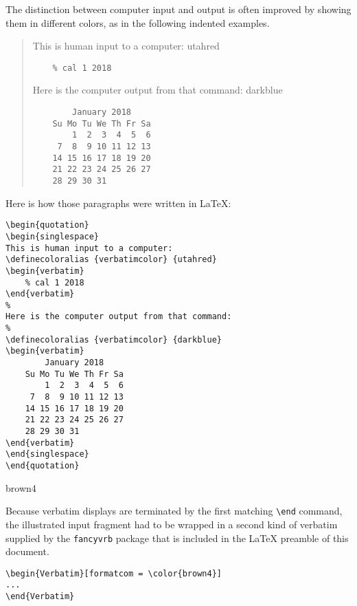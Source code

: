The distinction between computer input and output is often improved by
showing them in different colors, as in the following indented examples.

\begin{quotation}
\begin{singlespace}
This is human input to a computer:
 {utahred}
\begin{verbatim}
    % cal 1 2018
\end{verbatim}
%
Here is the computer output from that command:
%
 {darkblue}
\begin{verbatim}
        January 2018      
    Su Mo Tu We Th Fr Sa  
        1  2  3  4  5  6  
     7  8  9 10 11 12 13  
    14 15 16 17 18 19 20  
    21 22 23 24 25 26 27  
    28 29 30 31           
\end{verbatim}
\end{singlespace}
\end{quotation}
%
Here is how those paragraphs were written in \LaTeX{}:
%
\begin{Verbatim}[formatcom = \color{brown4}]
\begin{quotation}
\begin{singlespace}
This is human input to a computer:
\definecoloralias {verbatimcolor} {utahred}
\begin{verbatim}
    % cal 1 2018
\end{verbatim}
%
Here is the computer output from that command:
%
\definecoloralias {verbatimcolor} {darkblue}
\begin{verbatim}
        January 2018      
    Su Mo Tu We Th Fr Sa  
        1  2  3  4  5  6  
     7  8  9 10 11 12 13  
    14 15 16 17 18 19 20  
    21 22 23 24 25 26 27  
    28 29 30 31           
\end{verbatim}
\end{singlespace}
\end{quotation}
\end{Verbatim}

 {brown4}

Because verbatim displays are terminated by the first matching
\verb=\end= command, the illustrated input fragment had to be wrapped
in a second kind of verbatim supplied by the \texttt{fancyvrb} package
that is included in the \LaTeX{} preamble of this document.
%
\begin{verbatim}
\begin{Verbatim}[formatcom = \color{brown4}]
...
\end{Verbatim}
\end{verbatim}
%

